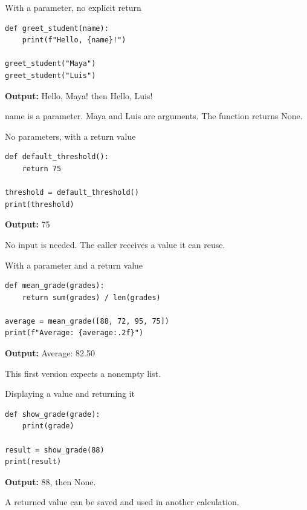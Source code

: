 \documentclass[aspectratio=169,12pt]{beamer}
\begin{document}
\begin{frame}[fragile]{With a parameter, no explicit return}
\begin{lstlisting}
def greet_student(name):
    print(f"Hello, {name}!")

greet_student("Maya")
greet_student("Luis")
\end{lstlisting}
\textbf{Output:} Hello, Maya! then Hello, Luis!
\par name is a parameter. Maya and Luis are arguments. The function returns None.

\end{frame}
\begin{frame}[fragile]{No parameters, with a return value}
\begin{lstlisting}
def default_threshold():
    return 75

threshold = default_threshold()
print(threshold)
\end{lstlisting}
\textbf{Output:} 75
\par No input is needed. The caller receives a value it can reuse.

\end{frame}
\begin{frame}[fragile]{With a parameter and a return value}
\begin{lstlisting}
def mean_grade(grades):
    return sum(grades) / len(grades)

average = mean_grade([88, 72, 95, 75])
print(f"Average: {average:.2f}")
\end{lstlisting}
\textbf{Output:} Average: 82.50
\par This first version expects a nonempty list.

\end{frame}
\begin{frame}[fragile]{Displaying a value and returning it}
\begin{lstlisting}
def show_grade(grade):
    print(grade)

result = show_grade(88)
print(result)
\end{lstlisting}
\textbf{Output:} 88, then None.
\par A returned value can be saved and used in another calculation.

\end{frame}
\end{document}
